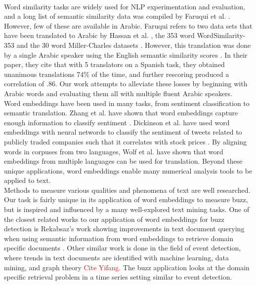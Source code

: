 \\
Word similarity tasks are widely used for NLP experimentation and evaluation, and a long list of semantic similarity data was compiled by Faruqui et al. \cite{faruqui:2014}. However, few of these are available in Arabic. Faruqui refers to two data sets that have been translated to Arabic by Hassan et al. \cite{hassan:2009}, the 353 word WordSimilarity-353 and the 30 word Miller-Charles datasets \cite{finkelstein:2001,miller:1991}. However, this translation was done by a single Arabic speaker using the English semantic similarity scores \cite{hassan:2009}. In their paper, they cite that with 5 translators on a Spanish task, they obtained unanimous translations 74\% of the time, and further rescoring produced a correlation of .86. Our work attempts to alleviate these losses by beginning with Arabic words and evaluating them all with multiple fluent Arabic speakers.
\\
Word embeddings have been used in many tasks, from sentiment classification to semantic translation. Zhang et al. have shown that word embeddings capture enough information to classify sentiment \cite{zhang2015chinese}. Dickinson et al. have used word embeddings with neural networds to classify the sentiment of tweets related to publicly traded companies such that it correlates with stock prices \cite{dickinson2015sentiment}. By aligning words in corpuses from two languages, Wolf et al. have shown that word embeddings from multiple languages can be used for translation. Beyond these unique applications, word embeddings enable many numerical analysis tools to be applied to text.
\\
Methods to measure various qualities and phenomena of text are well researched. Our task is fairly unique in its application of word embeddings to measure buzz, but is inspired and influenced by a many well-explored text mining tasks. One of the closest related works to our application of word embeddings for buzz detection is Rekabsaz's work showing improvements in text document querying when using semantic information from word embeddings to retrieve domain specific documents \cite{rekabsazusing}. Other similar work is done in the field of event detection, where trends in text documents are identified with machine learning, data mining, and graph theory \cite{radinsky2012learning} \textcolor{red}{Cite Yifang}. The buzz application looks at the domain specific retrieval problem in a time series setting similar to event detection.